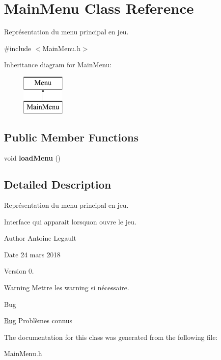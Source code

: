 \hypertarget{class_main_menu}{}\section{Main\+Menu Class Reference}
\label{class_main_menu}


Représentation du menu principal en jeu.  




{\ttfamily \#include $<$Main\+Menu.\+h$>$}

Inheritance diagram for Main\+Menu\+:\begin{figure}[H]
\begin{center}
\leavevmode
\includegraphics[height=2.000000cm]{class_main_menu}
\end{center}
\end{figure}
\subsection*{Public Member Functions}
\begin{DoxyCompactItemize}
\item 
\hypertarget{class_main_menu_a3be93bd9b623921e488b640dcd2c2642}{}void {\bfseries load\+Menu} ()\label{class_main_menu_a3be93bd9b623921e488b640dcd2c2642}

\end{DoxyCompactItemize}


\subsection{Detailed Description}
Représentation du menu principal en jeu. 

Interface qui apparait lorsqu\textquotesingle{}on ouvre le jeu. \begin{DoxyAuthor}{Author}
Antoine Legault 
\end{DoxyAuthor}
\begin{DoxyDate}{Date}
24 mars 2018 
\end{DoxyDate}
\begin{DoxyVersion}{Version}
0. 
\end{DoxyVersion}
\begin{DoxyWarning}{Warning}
Mettre les warning si nécessaire. 
\end{DoxyWarning}
\begin{DoxyRefDesc}{Bug}
\item[\hyperlink{bug__bug000006}{Bug}]Problèmes connus \end{DoxyRefDesc}


The documentation for this class was generated from the following file\+:\begin{DoxyCompactItemize}
\item 
Main\+Menu.\+h\end{DoxyCompactItemize}
